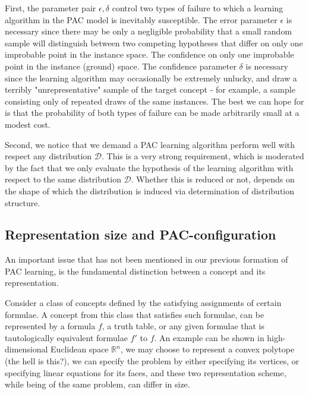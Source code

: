 First, the parameter pair $\epsilon, \delta$ control two types of failure to which a learning algorithm in the PAC model is inevitably susceptible. The error parameter $\epsilon$ is necessary since there may be only a negligible probability that a small random sample will distinguish between two competing hypotheses that differ on only one improbable point in the instance space. The confidence on only one improbable point in the instance (ground) space. The confidence parameter $\delta$ is necessary since the learning algorithm may occasionally be extremely unlucky, and draw a terribly "unrepresentative" sample of the target concept - for example, a sample consisting only of repeated draws of the same instances. The best we can hope for is that the probability of both types of failure can be made arbitrarily small at a modest cost. 

Second, we notice that we demand a PAC learning algorithm perform well with respect any distribution $\mathcal{D}$. This is a very strong requirement, which is moderated by the fact that we only evaluate the hypothesis of the learning algorithm with respect to the same distribution $\mathcal{D}$. Whether this is reduced or not, depends on the shape of which the distribution is induced via determination of distribution structure. 

\subsection{Representation size and PAC-configuration}

An important issue that has not been mentioned in our previous formation of PAC learning, is the fundamental distinction between a concept and its representation. 

Consider a class of concepts defined by the satisfying assignments of certain formulae. A concept from this class that satisfies such formulae, can be represented by a formula $f$, a truth table, or any given formulae that is tautologically equivalent formulae $f'$ to $f$. An example can be shown in high-dimensional Euclidean space $\mathbb{R}^n$, we may choose to represent a convex polytope (the hell is this?), we can specify the problem by either specifying its vertices, or specifying linear equations for its faces, and these two representation scheme, while being of the same problem, can differ in size. 

